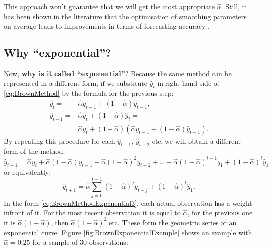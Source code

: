 \documentclass[]{book}
\theoremstyle{definition}
\theoremstyle{definition}
\theoremstyle{definition}
\theoremstyle{definition}
\theoremstyle{remark}
\begin{document}
This approach won't guarantee that we will get the most appropriate \(\hat{\alpha}\). Still, it has been shown in the literature that the optimisation of smoothing parameters on average leads to improvements in terms of forecasting accuracy \citep[see, for example,][]{Gardner1985}.

\hypertarget{whyExponential}{%
\subsection{Why ``exponential''?}\label{whyExponential}}

Now, \textbf{why is it called ``exponential''}? Because the same method can be represented in a different form, if we substitute \(\hat{y}_{t}\) in right hand side of \eqref{eq:BrownMethod} by the formula for the previous step:
\begin{equation}
  \begin{aligned}
  \hat{y}_{t} = &\hat{\alpha} {y}_{t-1} + (1 -\hat{\alpha}) \hat{y}_{t-1}, \\
  \hat{y}_{t+1} = &\hat{\alpha} {y}_{t} + (1 -\hat{\alpha}) \hat{y}_{t} = \\
  & \hat{\alpha} {y}_{t} + (1 -\hat{\alpha}) \left( \hat{\alpha} {y}_{t-1} + (1 -\hat{\alpha}) \hat{y}_{t-1} \right).
  \end{aligned}
  \label{eq:BrownMethodExponential1}
\end{equation}
By repeating this procedure for each \(\hat{y}_{t-1}\), \(\hat{y}_{t-2}\) etc, we will obtain a different form of the method:
\begin{equation}
  \hat{y}_{t+1} = \hat{\alpha} {y}_{t} + \hat{\alpha} (1 -\hat{\alpha}) {y}_{t-1} + \hat{\alpha} (1 -\hat{\alpha})^2 {y}_{t-2} + \dots  + \hat{\alpha} (1 -\hat{\alpha})^{t-1} {y}_{1} + (1 -\hat{\alpha})^t \hat{y}_1 
  \label{eq:BrownMethodExponential2}
\end{equation}
or equivalently:
\begin{equation}
  \hat{y}_{t+1} = \hat{\alpha} \sum_{j=0}^{t-1} (1 -\hat{\alpha})^j {y}_{t-j} + (1 -\hat{\alpha})^t \hat{y}_1 .
  \label{eq:BrownMethodExponential3}
\end{equation}
In the form \eqref{eq:BrownMethodExponential3}, each actual observation has a weight infront of it. For the most recent observation it is equal to \(\hat{\alpha}\), for the previous one it is \(\hat{\alpha} (1 -\hat{\alpha})\), then \(\hat{\alpha} (1 -\hat{\alpha})^2\) etc. These form the geometric series or an exponential curve. Figure \ref{fig:BrownExponentialExample} shows an example with \(\hat{\alpha} =0.25\) for a sample of 30 observations:
\end{document}
